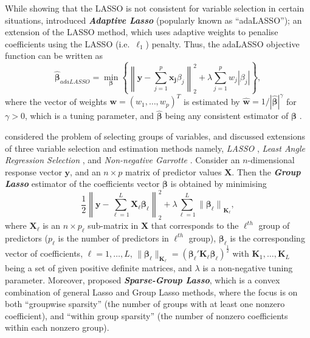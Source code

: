 \documentclass[11pt,a4paper,]{article}
\begin{document}
While showing that the LASSO is not consistent for variable selection in
certain situations, \textcite{Zou2006} introduced \textbf{\emph{Adaptive
Lasso}} (popularly known as ``adaLASSO''); an extension of the LASSO
method, which uses adaptive weights to penalise coefficients using the
LASSO (i.e.~\(\ell_{1}\)) penalty. Thus, the adaLASSO objective function
can be written as \[
 \bm{\hat{\beta}}_{adaLASSO} = \min_{\bm{\beta}}\left\{\left\lVert\bm{y} - \sum_{j=1}^{p} {\bm{x_{j}}\beta_{j}}\right\rVert_{2}^{2} + \lambda\sum_{j=1}^{p} {w_{j}|\beta_{j}|}\right\},
\] where the vector of weights
\(\bm{w} = \left (w_{1}, \dots, w_{p} \right )^{T}\) is estimated by
\(\bm{\hat{w}} = 1/|\bm{\hat{\beta}}|^{\gamma}\) for \(\gamma > 0\),
which is a tuning parameter, and \(\bm{\hat{\beta}}\) being any
consistent estimator of \(\bm{\beta}\) \autocite{Zou2006}.

\textcite{Yuan2006} considered the problem of selecting groups of
variables, and discussed extensions of three variable selection and
estimation methods namely, \emph{LASSO} \autocite{Tibshirani1996},
\emph{Least Angle Regression Selection} \autocite[LARS,][]{Efron2004},
and \emph{Non-negative Garrotte} \autocite{Breiman1995}. Consider an
\(n\)-dimensional response vector \(\bm{y}\), and an \(n \times p\)
matrix of predictor values \(\bm{X}\). Then the \textbf{\emph{Group
Lasso}} estimator of the coefficients vector \(\bm{\beta}\) is obtained
by minimising \[
 \frac{1}{2}\left\lVert\bm{y} - \sum_{\ell=1}^{L} {\bm{X}_{\ell}\bm{\beta}_{\ell}}\right\rVert_{2}^{2} + \lambda\sum_{\ell=1}^{L} {\lVert\bm{\beta}_{\ell}\rVert}_{\bm{K}_{\ell}},
\] where \(\bm{X}_{\ell}\) is an \(n \times p_{\ell}\) sub-matrix in
\(\bm{X}\) that corresponds to the \(\ell^{th}\) group of predictors
(\(p_{\ell}\) is the number of predictors in \(\ell^{th}\) group),
\(\bm{\beta}_{\ell}\) is the corresponding vector of coefficients,
\(\ell = 1, \dots, L\),
\(\lVert\bm{\beta}_{\ell}\rVert_{\bm{K}_{\ell}} = (\bm{\beta}_{\ell}' \bm{K}_{\ell} \bm{\beta}_{\ell})^{\frac{1}{2}}\)
with \(\bm{K}_{1}, \dots, \bm{K}_{L}\) being a set of given positive
definite matrices, and \(\lambda\) is a non-negative tuning parameter.
Moreover, \textcite{Simon2013} proposed \textbf{\emph{Sparse-Group
Lasso}}, which is a convex combination of general Lasso and Group Lasso
methods, where the focus is on both ``groupwise sparsity'' (the number
of groups with at least one nonzero coefficient), and ``within group
sparsity'' (the number of nonzero coefficients within each nonzero
group).
\end{document}
